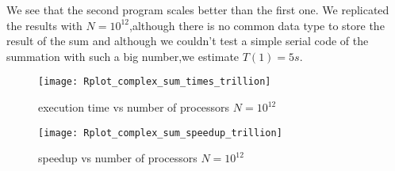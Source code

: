 \documentclass[11pt]{scrartcl} %
\begin{document}
We see that the second program scales better than the first one.
We replicated the results with $N=10^{12}$,although there is no common data type to store the result of the sum and although we couldn't test a simple serial code of the summation with such a big number,we estimate $T(1) = 5 s$.
\begin{figure}[H] %
	\centering
	\texttt{[image: Rplot\_complex\_sum\_times\_trillion]} %
	\caption{execution time vs number of processors $N= 10^12$}
\end{figure}
\begin{figure}[H] %
	\centering
	\texttt{[image: Rplot\_complex\_sum\_speedup\_trillion]} %
	\caption{speedup vs number of processors $N= 10^12$}
\end{figure}








\end{document}
